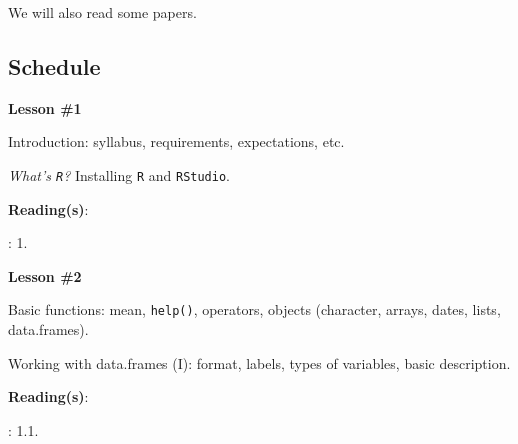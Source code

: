 \documentclass[letterpaper]{article}
\renewenvironment{itemize}{
  \begin{list}{}{
    \setlength{\leftmargin}{1.5em}
  }
}{
  \end{list}
}
\begin{document}
\begin{itemize}
\item[{\color{red}\Pointinghand}] We will also read some papers.
\end{itemize}


\subsection*{Schedule}


\begin{enumerate}
	\item {}

			\begin{itemize} 
				\item[$\bullet$] {\bf Lesson \#1}
				\begin{itemize} 
					\item[$\circ$] Introduction: syllabus, requirements, expectations, etc.
					\item[$\circ$] \emph{What's \texttt{R}?} Installing \texttt{R} and \texttt{RStudio}.
					\item[$\circ$] {\bf Reading(s)}: 
						\begin{itemize} 
							\item[$\diamond$] \textcite{Wooldridge2002}: 1.
									\end{itemize}
				\end{itemize}
			\end{itemize}






			\begin{itemize} 
				\item[$\bullet$] {\bf Lesson \#2}
				\begin{itemize} 
					\item[$\circ$] Basic functions: mean, \texttt{help()}, operators, objects (character, arrays, dates, lists, data.frames).
					\item[$\circ$] Working with data.frames (I): format, labels, types of variables, basic description. %
					\item[$\circ$] {\bf Reading(s)}: 
					\begin{itemize}
						\item[$\diamond$] \textcite{Fox:2010vc}: 1.1.
					\end{itemize}
				\end{itemize}
			\end{itemize}





\end{enumerate}
\end{document}
